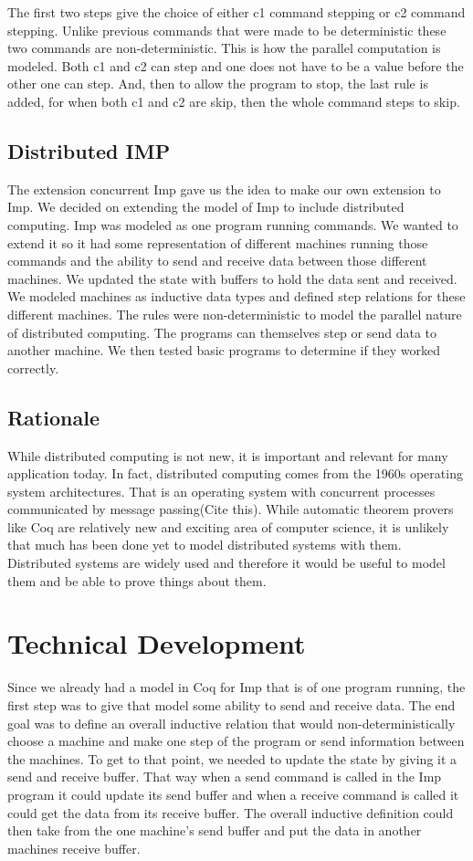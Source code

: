 \documentclass{llncs}
\begin{document}
The first two steps give the choice of either c1 command stepping or c2 command stepping. Unlike previous commands that were made to be deterministic these two commands are non-deterministic. This is how the parallel computation is modeled. Both c1 and c2 can step and one does not have to be a value before the other one can step. And, then to allow the program to stop, the last rule is added, for when both c1 and c2 are skip, then the whole command steps to skip. 

\subsection{Distributed IMP} 
The extension concurrent Imp gave us the idea to make our own extension to Imp. We decided on extending the model of Imp to include distributed computing. Imp was modeled as one program running commands. We wanted to extend it so it had some representation of different machines running those commands and the ability to send and receive data between those different machines. We updated the state with buffers to hold the data sent and received. We modeled machines as inductive data types and defined step relations for these different machines. The rules were non-deterministic to model the parallel nature of distributed computing. The programs can themselves step or send data to another machine. We then tested basic programs to determine if they worked correctly.

\subsection{Rationale}
While distributed computing is not new, it is important and relevant for many application today. In fact, distributed computing comes from the 1960s operating system architectures. That is an operating system with concurrent processes communicated by message passing(Cite this). While automatic theorem provers like Coq are relatively new and exciting area of computer science, it is unlikely that much has been done yet to model distributed systems with them. Distributed systems are widely used and therefore it would be useful to model them and be able to prove things about them. 

\section{Technical Development}
Since we already had a model in Coq for Imp that is of one program running, the first step was to give that model some ability to send and receive data. The end goal was to define an overall inductive relation that would non-deterministically choose a machine and make one step of the program or send information between the machines. To get to that point, we needed to update the state by giving it a send and receive buffer. That way when a send command is called in the Imp program it could update its send buffer and when a receive command is called it could get the data from its receive buffer. The overall inductive definition could then take from the one machine's send buffer and put the data in another machines receive buffer.
\end{document}
